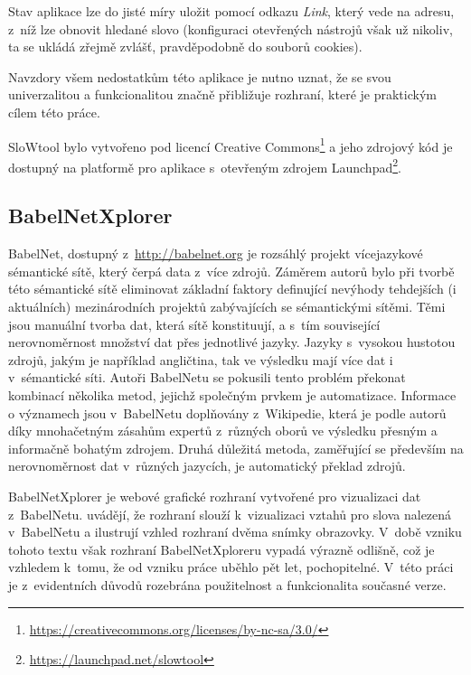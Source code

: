 \documentclass[a4paper,11pt,openany,twoside]{book}
\begin{document}
					Stav aplikace lze do jisté míry uložit pomocí odkazu \textit{Link}, který vede na adresu, z~níž lze obnovit hledané slovo (konfiguraci otevřených nástrojů však už nikoliv, ta se ukládá zřejmě zvlášť, pravděpodobně do souborů cookies).

					Navzdory všem nedostatkům této aplikace je nutno uznat, že se svou univerzalitou a funkcionalitou značně přibližuje rozhraní, které je praktickým cílem této práce.

					SloWtool bylo vytvořeno pod licencí Creative Commons\footnote{\url{https://creativecommons.org/licenses/by-nc-sa/3.0/}} a jeho zdrojový kód je dostupný na platformě pro aplikace s~otevřeným zdrojem Launchpad\footnote{\url{https://launchpad.net/slowtool}}. \parencite{fivser2011visualizing}

				\subsection{BabelNetXplorer}
				\label{vis:babel}

					BabelNet, dostupný z~\url{http://babelnet.org} je rozsáhlý projekt vícejazykové sémantické sítě, který čerpá data z~více zdrojů. Záměrem autorů bylo při tvorbě této sémantické sítě 
					eliminovat základní faktory definující nevýhody tehdejších (i aktuálních) mezinárodních projektů zabývajících se sémantickými sítěmi. Těmi jsou manuální tvorba dat, která sítě konstituují, a s~tím související nerovnoměrnost množství dat přes jednotlivé jazyky. Jazyky s~vysokou hustotou zdrojů, jakým je například angličtina, tak ve výsledku mají více dat i v~sémantické síti. Autoři BabelNetu se pokusili tento problém překonat kombinací několika metod, jejichž společným prvkem je automatizace. Informace o významech jsou v~BabelNetu doplňovány z~Wikipedie, která je podle autorů díky mnohačetným zásahům expertů z~různých oborů ve výsledku přesným a informačně bohatým zdrojem. Druhá důležitá metoda, zaměřující se především na nerovnoměrnost dat v~různých jazycích, je automatický překlad zdrojů. \parencite{navigli2010babelnet}

					BabelNetXplorer je webové grafické rozhraní vytvořené pro vizualizaci dat z~BabelNetu. \textcite{navigli2012babelnetxplorer} uvádějí, že rozhraní slouží k~vizualizaci vztahů pro slova nalezená v~BabelNetu a ilustrují vzhled rozhraní dvěma snímky obrazovky. V~době vzniku tohoto textu však rozhraní BabelNetXploreru vypadá výrazně odlišně, což je vzhledem k~tomu, že od vzniku práce \textcite{navigli2012babelnetxplorer} uběhlo pět let, pochopitelné. V~této práci je z~evidentních důvodů rozebrána použitelnost a funkcionalita současné verze.
\end{document}
